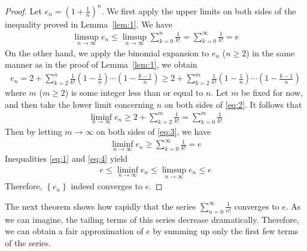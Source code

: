 \documentclass[thmcnt=section, 12pt]{elegantbook}
\begin{document}
\begin{proof}
    Let $e_n = \left(1+\frac{1}{n}\right)^n $. We first apply the upper limits on both sides of the inequality proved in Lemma~\ref{lem:1}. We have
    \begin{align}
        \limsup_{n \to \infty} e_n
        \leq \limsup_{n \to \infty} \sum_{k=0}^n \frac{1}{k!} 
        = \sum_{k=0}^\infty \frac{1}{k!}
        = e
        \label{eq:1}
    \end{align}
    On the other hand, we apply the binomial expansion to $e_n$ ($n \geq 2$) in the same manner as in the proof of Lemma~\ref{lem:1}, 
    we obtain
    \begin{align}
        e_n
        = 2 + \sum_{k=2}^{n} \frac{1}{k!} \left(1 - \frac{1}{n}\right) \cdots \left(1 - \frac{k-1}{n}\right)
        \geq 2 + \sum_{k=2}^{m} \frac{1}{k!} \left(1 - \frac{1}{n}\right) \cdots \left(1 - \frac{k-1}{n}\right)
        \label{eq:2}
    \end{align}
    where $m$ ($m \geq 2$) is some integer less than or equal to $n$. Let $m$ be fixed for now, and then take the lower limit concerning $n$ on both sides of \eqref{eq:2}. It follows that 
    \begin{align}
        \liminf_{n \to \infty} e_n 
        \geq 2 + \sum_{k=2}^{m} \frac{1}{k!} 
        = \sum_{k=0}^{m} \frac{1}{k!}
        \label{eq:3}
    \end{align}
    Then by letting $m \to \infty$ on both sides of \eqref{eq:3}, we have
    \begin{align}
        \liminf_{n \to \infty} e_n 
        \geq \sum_{k=0}^{\infty} \frac{1}{k!}
        = e
        \label{eq:4}
    \end{align}
    Inequalities \eqref{eq:1} and \eqref{eq:4} yield
    \begin{align*}
        e \leq \liminf_{n \to \infty} e_n \leq 
        \limsup_{n \to \infty} e_n \leq e
    \end{align*}
    Therefore, $\left\{e_n\right\}$ indeed converges to $e$.
\end{proof}


\par The next theorem shows how rapidly that the series $\sum_{n=0}^\infty \frac{1}{n!}$ converges to $e$. As we can imagine, the tailing terms of this series decrease dramatically. Therefore, we can obtain a fair approximation of $e$ by summing up only the first few terms of the series. 
\end{document}
